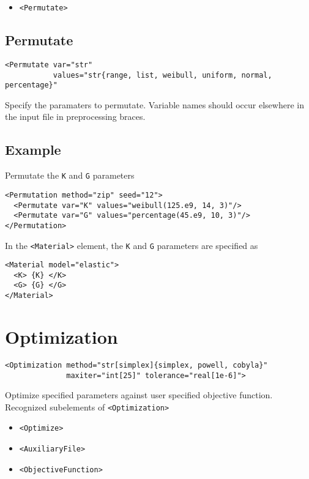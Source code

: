 \documentclass[11pt]{report}
\newcommand{\tag}[1]{\texttt{<#1>}}
\begin{document}
\begin{itemize}
  \item \tag{Permutate}
\end{itemize}

\subsection{Permutate}
\begin{verbatim}
<Permutate var="str"
           values="str{range, list, weibull, uniform, normal, percentage}"
\end{verbatim}
%
Specify the paramaters to permutate. Variable names should occur elsewhere in
the input file in preprocessing braces.

\subsection{Example}
Permutate the \texttt{K} and \texttt{G} parameters
%
\begin{verbatim}
<Permutation method="zip" seed="12">
  <Permutate var="K" values="weibull(125.e9, 14, 3)"/>
  <Permutate var="G" values="percentage(45.e9, 10, 3)"/>
</Permutation>
\end{verbatim}

In the \tag{Material} element, the \texttt{K} and \texttt{G} parameters are
specified as
%
\begin{verbatim}
<Material model="elastic">
  <K> {K} </K>
  <G> {G} </G>
</Material>
\end{verbatim}


\section{Optimization}
\begin{verbatim}
<Optimization method="str[simplex]{simplex, powell, cobyla}"
              maxiter="int[25]" tolerance="real[1e-6]">
\end{verbatim}
%
Optimize specified parameters against user specified objective function.
Recognized subelements of \tag{Optimization}

\begin{itemize}
  \item \tag{Optimize}
  \item \tag{AuxiliaryFile}
  \item \tag{ObjectiveFunction}
\end{itemize}
\end{document}
